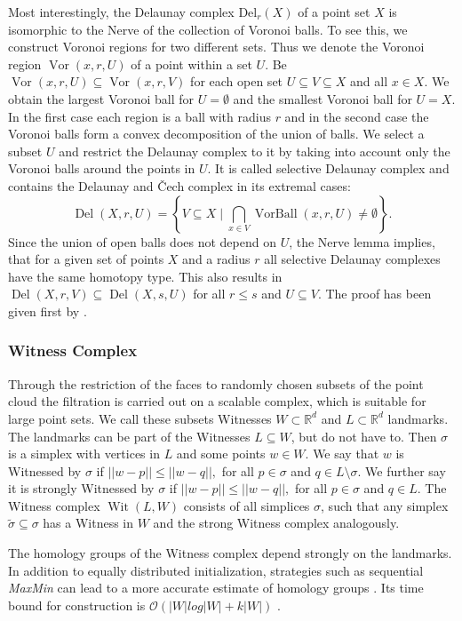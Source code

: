 \documentclass[runningheads]{llncs}
\DeclareMathOperator{\VorBall}{\text{VorBall}}
\DeclareMathOperator{\Vor}{\text{Vor}}
\DeclareMathOperator{\Del}{\text{Del}}
\DeclareMathOperator{\Wit}{\text{Wit}}
\begin{document}
Most interestingly, the Delaunay complex $\text{Del}_r(X)$ of a point set $X$ is isomorphic to the Nerve of the collection of Voronoi balls. To see this, we construct Voronoi regions for two different sets. Thus we denote the Voronoi region $\Vor(x,r,U)$ of a point within a set $U$. Be $\Vor(x,r,U) \subseteq \Vor(x,r,V)$ for each open set $U \subseteq V \subseteq X$ and all $x \in X$. We obtain the largest Voronoi ball for $U = \emptyset$ and the smallest Voronoi ball for $U = X$. In the first case each region is a ball with radius $r$ and in the second case the Voronoi balls form a convex decomposition of the union of balls. We select a subset $U$ and restrict the Delaunay complex to it by taking into account only the Voronoi balls around the points in $U$. It is called selective Delaunay complex and contains the Delaunay and \v{Cech} complex in its extremal cases:
\begin{equation}
\Del(X,r,U) = \left\{V \subseteq X \; \bigg\vert \; \bigcap_{x \in V} \VorBall(x,r,U) \neq \emptyset \right\}.
\end{equation}
Since the union of open balls does not depend on $U$, the Nerve lemma implies, that for a given set of points $X$ and a radius $r$ all selective Delaunay complexes have the same homotopy type. This also results in $\Del(X,r,V) \subseteq \Del(X,s,U)$ for all $r \leq s$ and $U \subseteq V$. The proof has been given first by \cite[§3.4]{bauer2017morse}.

\subsubsection{Witness Complex} Through the restriction of the faces to randomly chosen subsets of the point cloud the filtration is carried out on a scalable complex, which is suitable for large point sets. We call these subsets Witnesses $W \subset \mathbb{R}^d$ and $L \subset \mathbb{R}^d$ landmarks. The landmarks can be part of the Witnesses $L \subseteq W$, but do not have to. Then $\sigma$ is a simplex with vertices in $L$ and some points $w \in W$. We say that $w$ is Witnessed by $\sigma$ if $||w-p|| \leq ||w-q||,$ for all $p \in \sigma$ and $q \in L \setminus \sigma.$ We further say it is strongly Witnessed by $\sigma$ if $||w-p|| \leq ||w-q||,$ for all $p \in \sigma$ and $q \in L$. The Witness complex $\Wit(L,W)$ consists of all simplices $\sigma$, such that any simplex $\tilde{\sigma} \subseteq \sigma$ has a Witness in $W$ and the strong Witness complex analogously.

The homology groups of the Witness complex depend strongly on the landmarks. In addition to equally distributed initialization, strategies such as sequential \textit{MaxMin} can lead to a more accurate estimate of homology groups \cite{de2004topological}. Its time bound for construction is $\mathcal{O}\left(|W|log|W|+k|W|\right)$ \cite{boissonnat2018geometric}.
\end{document}
